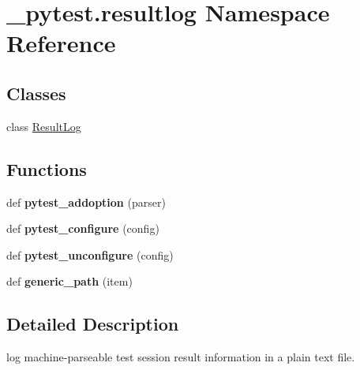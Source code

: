 \hypertarget{namespace__pytest_1_1resultlog}{}\section{\+\_\+pytest.\+resultlog Namespace Reference}
\label{namespace__pytest_1_1resultlog}
\subsection*{Classes}
\begin{DoxyCompactItemize}
\item 
class \hyperlink{class__pytest_1_1resultlog_1_1_result_log}{Result\+Log}
\end{DoxyCompactItemize}
\subsection*{Functions}
\begin{DoxyCompactItemize}
\item 
\mbox{\label{namespace__pytest_1_1resultlog_a0f9079a7e7da5a6d9f78ef2ce21416d4}} 
def {\bfseries pytest\+\_\+addoption} (parser)
\item 
\mbox{\label{namespace__pytest_1_1resultlog_a72acebd3a3bce89ac52a7056f18e8daf}} 
def {\bfseries pytest\+\_\+configure} (config)
\item 
\mbox{\label{namespace__pytest_1_1resultlog_a07e4f9f20548946e7397ffbf3c2ce6b3}} 
def {\bfseries pytest\+\_\+unconfigure} (config)
\item 
\mbox{\label{namespace__pytest_1_1resultlog_a7d16e1a52755a78a63b5ac9c168ada9f}} 
def {\bfseries generic\+\_\+path} (item)
\end{DoxyCompactItemize}


\subsection{Detailed Description}
\begin{DoxyVerb}log machine-parseable test session result information in a plain
text file.
\end{DoxyVerb}
 